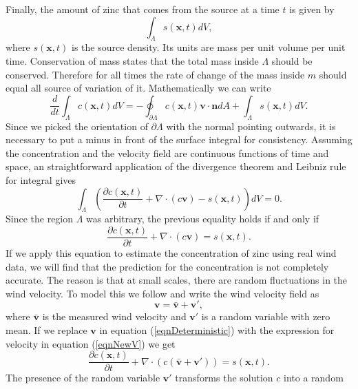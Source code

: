 \documentclass[12pt]{book}
\newcommand{\x}{\textbf{x}}
\newcommand{\vv}{\textbf{v}}
\begin{document}
Finally, the amount of zinc that comes from the source at a time $t$ is given by
\begin{equation*}
\int_{\Lambda}s(\x,t)dV,
\end{equation*}
where $s(\x,t)$ is the source density. Its units are mass per unit volume per unit time.
Conservation of mass states that the total mass inside $\Lambda$ should be conserved. Therefore
for all times the rate of change of the mass inside $m$ should equal all source of variation of it.
Mathematically we can write
\begin{equation*}
\frac{d}{dt}\int_{\Lambda}c(\x,t)dV=-\oint_{\partial\Lambda}c(\x,t)\textbf{v}\cdot\textbf{n}dA+\int_{\Lambda}s(\x,t)dV.
\end{equation*}
Since we picked the orientation of $\partial\Lambda$ with the normal pointing outwards, it is
necessary to put a minus in front of the surface integral for consistency. Assuming
the concentration and the velocity field are continuous functions of time and space, an 
straightforward application of the divergence theorem and Leibniz rule for integral gives
\begin{equation*}
\int_{\Lambda}\left(\frac{\partial c(\x,t)}{\partial t}+\nabla\cdot(c\textbf{v})-s(\x,t)\right)dV=0.
\end{equation*}
Since the region $\Lambda$ was arbitrary, the previous equality holds if and only if
\begin{equation}\label{eqnDeterministic}
\frac{\partial c(\x,t)}{\partial t}+\nabla\cdot(c\textbf{v})=s(\x,t).
\end{equation}
If we apply this equation to estimate the concentration of zinc using real wind data, we 
will find that the prediction for the concentration is not completely accurate. 
The reason is that at small scales, there
are random fluctuations in the wind velocity. To model this we follow \cite{seinfeld1998atmospheric}
and write the wind velocity field as
\begin{equation}\label{eqnNewV}
\vv=\bar{\vv}+\vv',
\end{equation}
where $\bar{\vv}$ is the measured wind velocity and $\vv'$ is a random variable with zero mean.
If we replace $\vv$ in equation (\ref{eqnDeterministic}) with the expression for velocity
in equation (\ref{eqnNewV}) we get
\begin{equation}\label{eqnNewRandom}
\frac{\partial c(\x,t)}{\partial t}+\nabla\cdot(c(\bar{\textbf{v}}+\vv'))=s(\x,t).
\end{equation}
The presence of the random variable $\vv'$ transforms the solution $c$ into a random 
\end{document}
